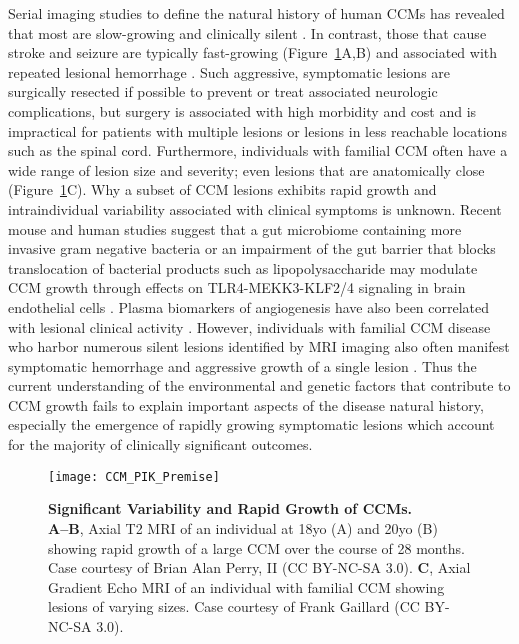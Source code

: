 Serial imaging studies to define the natural history of human CCMs has revealed that most are slow-growing and clinically silent \citep{akers2017, alshanisalman2012, horne2016}. In contrast, those that cause stroke and seizure are typically fast-growing (Figure~\ref{CCM_PIK_Premise}A,B) and associated with repeated lesional hemorrhage \citep{awad2019, porter1997}. Such aggressive, symptomatic lesions are surgically resected if possible to prevent or treat associated neurologic complications, but surgery is associated with high morbidity and cost and is impractical for patients with multiple lesions or lesions in less reachable locations such as the spinal cord. Furthermore, individuals with familial CCM often have a wide range of lesion size and severity; even lesions that are anatomically close (Figure~\ref{CCM_PIK_Premise}C). Why a subset of CCM lesions exhibits rapid growth and intraindividual variability associated with clinical symptoms is unknown. Recent mouse and human studies suggest that a gut microbiome containing more invasive gram negative bacteria or an impairment of the gut barrier that blocks translocation of bacterial products such as lipopolysaccharide may modulate CCM growth through effects on TLR4-MEKK3-KLF2/4 signaling in brain endothelial cells \citep{tang2019, tang2017, polster2020}. Plasma biomarkers of angiogenesis have also been correlated with lesional clinical activity \citep{girard2018, lyne2019}. However, individuals with familial CCM disease who harbor numerous silent lesions identified by MRI imaging also often manifest symptomatic hemorrhage and aggressive growth of a single lesion \citep{polster2019}. Thus the current understanding of the environmental and genetic factors that contribute to CCM growth fails to explain important aspects of the disease natural history, especially the emergence of rapidly growing symptomatic lesions which account for the majority of clinically significant outcomes.

\begin{figure}[tbp!]
\begin{center}
\texttt{[image: CCM\_PIK\_Premise]}
\end{center}
\caption[Significant Variability and Rapid Growth of CCMs] {\textbf{Significant Variability and Rapid Growth of CCMs.} \\ \textbf{A--B},  Axial T2 MRI of an individual at 18yo (A) and 20yo (B) showing rapid growth of a large CCM over the course of 28 months. Case courtesy of Brian Alan Perry, II (CC BY-NC-SA 3.0). \textbf{C}, Axial Gradient Echo MRI of an individual with familial CCM showing lesions of varying sizes. Case courtesy of Frank Gaillard (CC BY-NC-SA 3.0).}


\label{CCM_PIK_Premise}
\end{figure}

